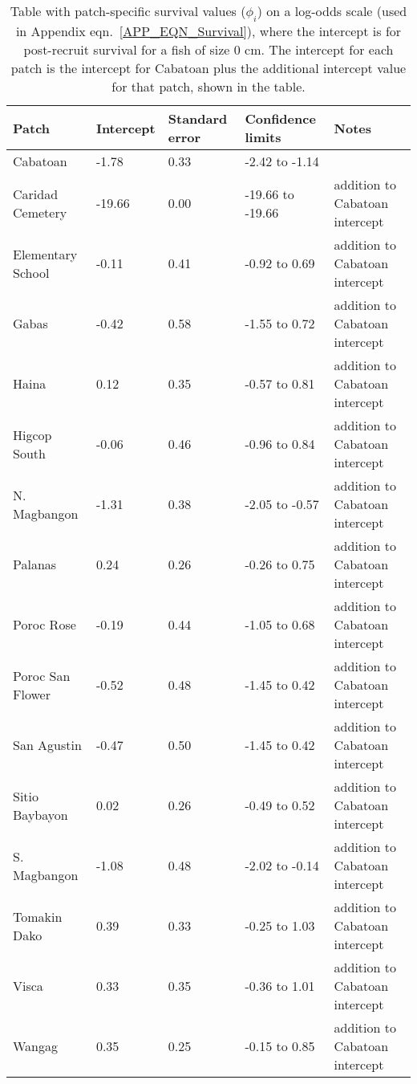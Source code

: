 \documentclass[12pt, oneside]{article}   	%
\begin{document}
\begin{table}[htbp] 
\begin{centering}
\caption{Table with patch-specific survival values ($\phi_i$) on a log-odds scale (used in Appendix eqn.\ \ref{APP_EQN_Survival}), where the intercept is for post-recruit survival for a fish of size 0 cm. The intercept for each patch is the intercept for Cabatoan plus the additional intercept value for that patch, shown in the table.} \label{APP_TAB_SiteSurvivals}
\begin{tabular}{|p{1.1in}|p{0.75in}|p{0.75in}|p{1.25in}|p{1.5in}|}
\hline 
\textbf{Patch} & \textbf{Intercept} & \textbf{Standard error} & \textbf{Confidence limits} & \textbf{Notes} \\ \hline
Cabatoan & -1.78 & 0.33 & -2.42 to -1.14 & \\ \hline
Caridad Cemetery & -19.66 & 0.00 & -19.66 to -19.66 & addition to Cabatoan intercept \\ \hline
Elementary School & -0.11 & 0.41 & -0.92 to 0.69 & addition to Cabatoan intercept \\ \hline
Gabas & -0.42 & 0.58 & -1.55 to 0.72 & addition to Cabatoan intercept \\ \hline
Haina & 0.12 & 0.35 & -0.57 to 0.81 & addition to Cabatoan intercept \\ \hline
Higcop South & -0.06 & 0.46 & -0.96 to 0.84 & addition to Cabatoan intercept \\ \hline
N. Magbangon & -1.31 & 0.38 & -2.05 to -0.57 & addition to Cabatoan intercept \\ \hline
Palanas & 0.24 & 0.26 & -0.26 to 0.75 & addition to Cabatoan intercept \\ \hline
Poroc Rose & -0.19 & 0.44 & -1.05 to 0.68 & addition to Cabatoan intercept \\ \hline
Poroc San Flower & -0.52 & 0.48 & -1.45 to 0.42 & addition to Cabatoan intercept \\ \hline
San Agustin & -0.47 & 0.50 & -1.45 to 0.42 & addition to Cabatoan intercept \\ \hline
Sitio Baybayon & 0.02 & 0.26 & -0.49 to 0.52 & addition to Cabatoan intercept \\ \hline
S. Magbangon & -1.08 & 0.48 & -2.02 to -0.14 & addition to Cabatoan intercept \\ \hline
Tomakin Dako & 0.39 & 0.33 & -0.25 to 1.03 & addition to Cabatoan intercept \\ \hline
Visca & 0.33 & 0.35 & -0.36 to 1.01 & addition to Cabatoan intercept \\ \hline
Wangag & 0.35 & 0.25 & -0.15 to 0.85 & addition to Cabatoan intercept \\ \hline
\end{tabular}
\end{centering}
\end{table}
\end{document}
